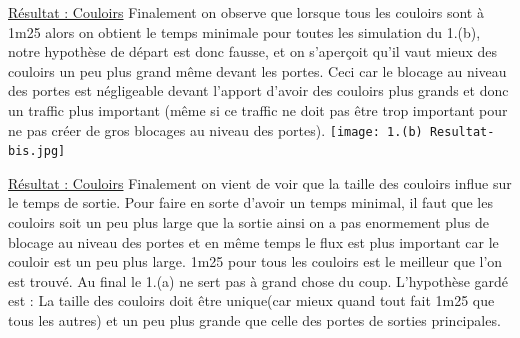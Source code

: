 \documentclass[12pt]{article}
\begin{document}
\underline{Résultat : Couloirs}
\newline
Finalement on observe que lorsque tous les couloirs sont à 1m25 alors on obtient le temps minimale pour toutes les simulation du 1.(b), notre hypothèse de départ est donc fausse, et on s'aperçoit qu'il vaut mieux
des couloirs un peu plus grand même devant les portes. Ceci car le blocage au niveau des portes est négligeable devant l'apport d'avoir des couloirs plus grands et donc un traffic plus important (même si ce traffic ne doit
pas être trop important pour ne pas créer de gros blocages au niveau des portes).
\newline
\texttt{[image: 1.(b) Resultat-bis.jpg]}\newline
\newline\newline

\underline{Résultat : Couloirs}
\newline
Finalement on vient de voir que la taille des couloirs influe sur le temps de sortie. Pour faire en sorte d'avoir un temps minimal, il faut que les couloirs soit un peu plus large que la sortie
ainsi on a pas enormement plus de blocage au niveau des portes et en même temps le flux est plus important car le couloir est un peu plus large.
1m25 pour tous les couloirs est le meilleur que l'on est trouvé.
\newline
Au final le 1.(a) ne sert pas à grand chose du coup.
\newline\newline
L'hypothèse gardé est : La taille des couloirs doit être unique(car mieux quand tout fait 1m25 que tous les autres) et un peu plus grande que celle des portes de sorties principales.
\end{document}

